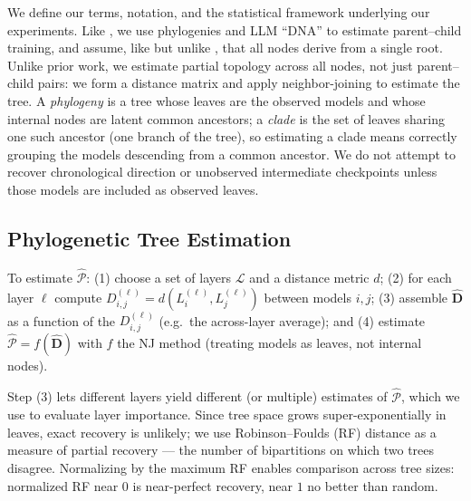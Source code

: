 \documentclass{article}
\theoremstyle{definition}
\theoremstyle{plain}
\begin{document}
We define our terms, notation, and the statistical framework underlying our experiments.
Like \citep{wu2026llmdna}, we use phylogenies and LLM ``DNA'' to estimate parent--child training, and
assume, like \citep{yu2025neural} but unlike \citep{horwitz2025mother}, that all nodes derive from a
single root. Unlike prior work, we estimate partial topology across all nodes, not just parent--child
pairs: we form a distance matrix and apply neighbor-joining \citep{saitou1987neighbor} to estimate the
tree. A \emph{phylogeny} is a tree whose leaves are the observed models and whose internal nodes are
latent common ancestors; a \emph{clade} is the set of leaves sharing one such ancestor (one branch of
the tree), so estimating a clade means correctly grouping the models descending from a common ancestor.
We do not attempt to recover chronological direction or unobserved intermediate checkpoints unless those
models are included as observed leaves.


\subsection{Phylogenetic Tree Estimation}
\label{sec:framework:phylo}

To estimate $\widehat{\mathcal{P}}$: (1) choose a set of layers $\mathcal{L}$ and a distance metric $d$;
(2) for each layer $\ell$ compute $D_{i,j}^{(\ell)} = d(L^{(\ell)}_i, L^{(\ell)}_j)$ between models
$i,j$; (3) assemble $\hat{\mathbf{D}}$ as a function of the $D_{i,j}^{(\ell)}$ (e.g.\ the across-layer
average); and (4) estimate $\widehat{\mathcal{P}} = f(\hat{\mathbf{D}})$ with $f$ the NJ method (treating
models as leaves, not internal nodes).

Step (3) lets different layers yield different (or multiple) estimates of $\widehat{\mathcal{P}}$, which we use to evaluate layer importance. Since tree space grows super-exponentially in leaves, exact recovery is unlikely; we use Robinson--Foulds (RF) distance \citep{robinson1981comparison} as a measure of partial recovery --- the number of bipartitions on which two trees disagree. Normalizing by the maximum RF enables comparison across tree sizes: normalized RF near $0$ is near-perfect recovery, near $1$ no better than random.
\end{document}
